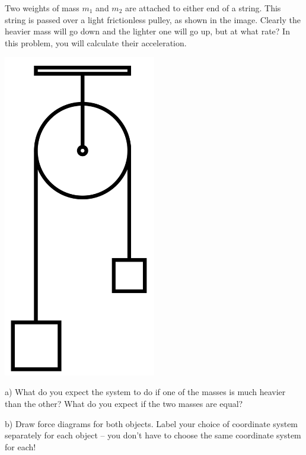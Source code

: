 \documentclass[12pt]{article}
\begin{document}
		\newpage
		\begin{minipage}{0.7\textwidth}
			Two weights of mass $m_1$ and $m_2$ are attached to either end of a string. This string is passed over a light frictionless pulley, as shown in the image.
			Clearly the heavier mass will go down and the lighter one will go up, but at what rate? In this problem, you will calculate their acceleration.
		\end{minipage} \hfill
		\begin{minipage}{0.3\textwidth}
			\begin{center}\includegraphics[width=0.5\textwidth]{atwood.png}
			\end{center}
		\end{minipage} \hfill
		
		a) What do you expect the system to do if one of the masses is much heavier than the other? What do you expect if the
		two masses are equal?
		
		\vspace{1in}
		
		b) Draw force diagrams for both objects. Label your choice of coordinate system separately for each object -- you don't have to choose the same coordinate system for each!
		
		\vspace{2in}
		
\end{document}
